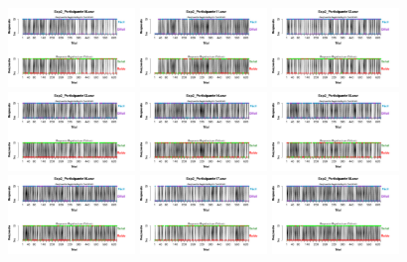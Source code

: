 \documentclass[a4paper ]{article}
\begin{document}
\begin{figure}[th]
\includegraphics[width=0.3\textwidth]{Figures/BiasResp_Exp2_P10} \includegraphics[width=0.3\textwidth]{Figures/BiasResp_Exp2_P11} \includegraphics[width=0.3\textwidth]{Figures/BiasResp_Exp2_P12}
\includegraphics[width=0.3\textwidth]{Figures/BiasResp_Exp2_P13} \includegraphics[width=0.3\textwidth]{Figures/BiasResp_Exp2_P14} \includegraphics[width=0.3\textwidth]{Figures/BiasResp_Exp2_P15}
\includegraphics[width=0.3\textwidth]{Figures/BiasResp_Exp2_P16} \includegraphics[width=0.3\textwidth]{Figures/BiasResp_Exp2_P17} \includegraphics[width=0.3\textwidth]{Figures/BiasResp_Exp2_P18}

\end{figure}
\end{document}
